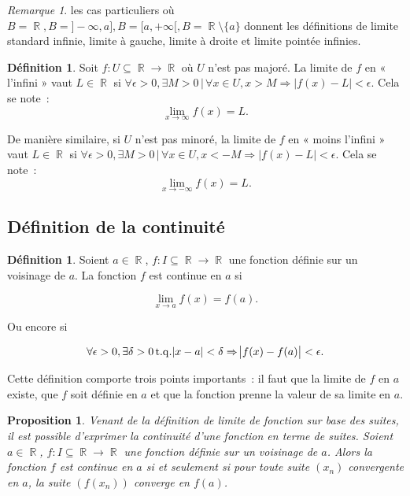 \documentclass{article}
\DeclareMathOperator{\R}{\mathbb R}
\DeclareMathOperator{\tq}{ t.q. }
\newtheorem{prp}[thm]{Proposition}
\theoremstyle{definition}
\newtheorem{déf}[thm]{Définition}
\theoremstyle{remark}
\newtheorem*{rmq}{Remarque}
\begin{document}
			\begin{rmq} les cas particuliers où $B = \R, B = ]-\infty, a], B = [a, +\infty[, B = \R \setminus \{a\}$ donnent les définitions de limite
			standard infinie, limite à gauche, limite à droite et limite pointée infinies. \end{rmq}

			\begin{déf} Soit $f : U \subseteq \R \to \R$ où $U$ n'est pas majoré. La limite de $f$ en « l'infini » vaut $L \in \R$ si
			$\forall \epsilon > 0, \exists M > 0 \, | \, \forall x \in U, x > M \Rightarrow |f(x) - L| < \epsilon$. Cela se note~:
			\[\lim_{x \to \infty}f(x) = L.\]

			De manière similaire, si $U$ n'est pas minoré, la limite de $f$ en « moins l'infini » vaut $L \in \R$ si
			$\forall \epsilon > 0, \exists M > 0 \, | \, \forall x \in U, x < -M \Rightarrow |f(x) - L| < \epsilon$. Cela se note~:
			\[\lim_{x \to -\infty}f(x) = L.\]
			\end{déf}

	\subsection{Définition de la continuité}
		\begin{déf} Soient $a \in \R$, $f : I \subseteq \R \to \R$ une fonction définie sur un voisinage de $a$. La fonction $f$ est continue en $a$ si 

		\[\lim_{x \to a}f(x) = f(a).\]

		Ou encore si

		\[\forall \epsilon > 0, \exists \delta > 0 \tq \abs{x-a} < \delta \Rightarrow \abs{f(x) - f(a)} < \epsilon.\]

		Cette définition comporte trois points importants~: il faut que la limite de $f$ en $a$ existe, que $f$ soit définie en $a$ et que la fonction prenne la valeur
		de sa limite en $a$.
		\end{déf}

		\begin{prp} Venant de la définition de limite de fonction sur base des suites, il est possible d'exprimer la continuité d'une fonction en terme
		de suites. Soient $a \in \R$, $f : I \subseteq \R \to \R$ une fonction définie sur un voisinage de $a$. Alors la fonction $f$ est continue en
		$a$ si et seulement si pour toute suite $(x_n)$ convergente en $a$, la suite $(f(x_n))$ converge en $f(a)$. \end{prp}
\end{document}
